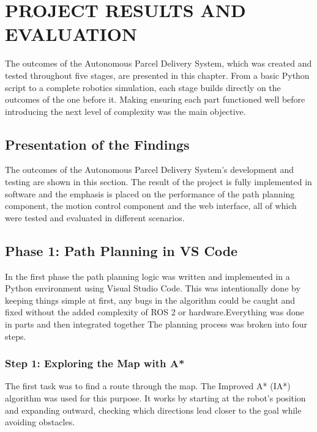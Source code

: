 \chapter{PROJECT RESULTS AND EVALUATION}

The outcomes of the Autonomous Parcel Delivery System, which was created and tested throughout five stages, are presented in this chapter. From a basic Python script to a complete robotics simulation, each stage builds directly on the outcomes of the one before it. Making ensuring each part functioned well before introducing the next level of complexity was the main objective.



\section{Presentation of the Findings}

The outcomes of the Autonomous Parcel Delivery System's development and testing are shown in this section. The result of the project is fully implemented in software and the emphasis is placed on the performance of the path planning component, the motion control component and the web interface, all of which were tested and evaluated in different scenarios.


\section{Phase 1: Path Planning in VS Code}

In the first phase the path planning logic was written and implemented in a Python environment using Visual Studio Code. This was intentionally done by keeping things simple at first, any bugs in the algorithm could be caught and fixed without the added complexity of ROS 2 or hardware.Everything was done in parts and then integrated together The planning process was broken into four steps.

\subsection{Step 1: Exploring the Map with A*}

The first task was to find a route through the map. The Improved A* (IA*) algorithm was used for this purpose. It works by starting at the robot's position and expanding outward, checking which directions lead closer to the goal while avoiding obstacles.

